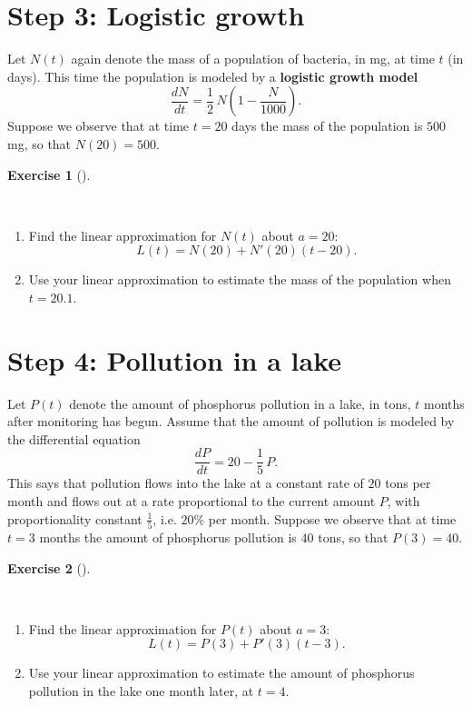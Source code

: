 \documentclass[
  letterpaper,
  DIV=11,
  numbers=noendperiod]{scrreprt}
\providecommand{\tightlist}{%
  \setlength{\itemsep}{0pt}\setlength{\parskip}{0pt}}
\theoremstyle{plain}
\theoremstyle{plain}
\theoremstyle{definition}
\theoremstyle{definition}
\newtheorem{exercise}{Exercise}[chapter]
\theoremstyle{definition}
\theoremstyle{plain}
\theoremstyle{plain}
\theoremstyle{remark}
\begin{document}
\section{Step 3: Logistic growth}\label{step-3-logistic-growth}

Let \(N(t)\) again denote the mass of a population of bacteria, in mg,
at time \(t\) (in days). This time the population is modeled by a
\textbf{logistic growth model} \[
\frac{dN}{dt} = \frac{1}{2}\,N\left(1 - \frac{N}{1000}\right).
\] Suppose we observe that at time \(t = 20\) days the mass of the
population is \(500\) mg, so that \(N(20) = 500\).

\begin{exercise}[]\protect\hypertarget{exr-activity-logistic-growth}{}\label{exr-activity-logistic-growth}

~

\begin{enumerate}
\def\labelenumi{\arabic{enumi}.}
\tightlist
\item
  Find the linear approximation for \(N(t)\) about \(a = 20\): \[
  L(t) = N(20) + N'(20)(t - 20).
  \]
\item
  Use your linear approximation to estimate the mass of the population
  when \(t = 20.1\).
\end{enumerate}

\end{exercise}

\section{Step 4: Pollution in a lake}\label{step-4-pollution-in-a-lake}

Let \(P(t)\) denote the amount of phosphorus pollution in a lake, in
tons, \(t\) months after monitoring has begun. Assume that the amount of
pollution is modeled by the differential equation \[
\frac{dP}{dt} = 20 - \frac{1}{5}\,P .
\] This says that pollution flows into the lake at a constant rate of
\(20\) tons per month and flows out at a rate proportional to the
current amount \(P\), with proportionality constant \(\tfrac15\), i.e.
\(20\%\) per month. Suppose we observe that at time \(t = 3\) months the
amount of phosphorus pollution is \(40\) tons, so that \(P(3) = 40\).

\begin{exercise}[]\protect\hypertarget{exr-activity-pollution}{}\label{exr-activity-pollution}

~

\begin{enumerate}
\def\labelenumi{\arabic{enumi}.}
\tightlist
\item
  Find the linear approximation for \(P(t)\) about \(a = 3\): \[
  L(t) = P(3) + P'(3)(t - 3).
  \]
\item
  Use your linear approximation to estimate the amount of phosphorus
  pollution in the lake one month later, at \(t = 4\).
\end{enumerate}

\end{exercise}
\end{document}
